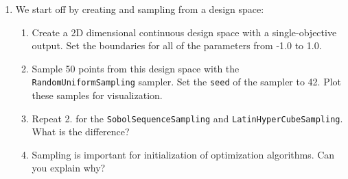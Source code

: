 \documentclass[10pt,a4paper,twoside]{article} %
\def\code#1{\texttt{#1}}
\begin{document}
\begin{enumerate}
	\setcounter{enumi}{0}
	\item We start off by creating and sampling from a design space:

	\begin{enumerate} [label*=\arabic*.]
		\item Create a 2D dimensional continuous design space with a single-objective output. Set the boundaries for all of the parameters from -1.0 to 1.0.
		
		\item Sample 50 points from this design space with the \code{RandomUniformSampling} sampler. Set the \code{seed} of the sampler to 42. Plot these samples for visualization.
		
		\item Repeat 2. for the \code{SobolSequenceSampling} and \code{LatinHyperCubeSampling}. What is the difference?
		
		\item Sampling is important for initialization of optimization algorithms. Can you explain why?
	\end{enumerate}
\end{enumerate}
\end{document}
